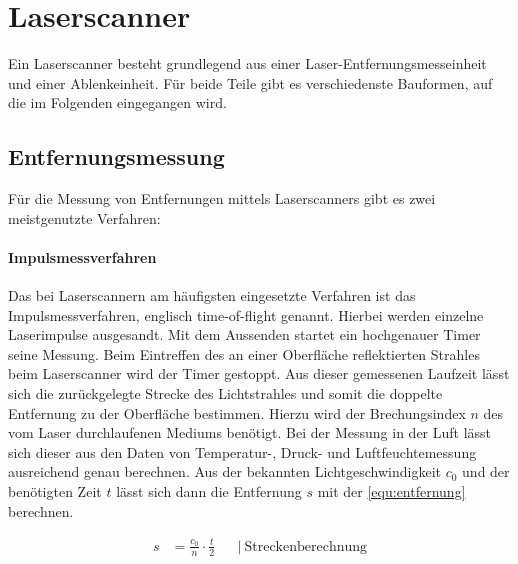 \documentclass[a4paper,12pt,bibliography=totoc, listof=totoc,titlepage,pointlessnumbers]{scrreprt}
\begin{document}
\section{Laser\-scan\-ner}
Ein Laser\-scan\-ner besteht grundlegend aus einer Laser-Entfernungsmesseinheit und einer Ablenkeinheit. Für beide Teile gibt es verschiedenste Bauformen, auf die im Folgenden eingegangen wird.

\subsection{Entfernungsmessung}
Für die Messung von Entfernungen mittels Laserscanners gibt es zwei meistgenutzte Verfahren:

\paragraph{Impulsmessverfahren}
\label{p:tof}
Das bei Laser\-scan\-nern am häufigsten eingesetzte Verfahren ist das Impulsmessverfahren, englisch time-of-flight genannt. Hierbei werden einzelne Laserimpulse ausgesandt. Mit dem Aussenden startet ein hochgenauer Timer seine Messung. Beim Eintreffen des an einer Oberfläche reflektierten Strahles beim Laser\-scan\-ner wird der Timer gestoppt. Aus dieser gemessenen Laufzeit lässt sich die zurückgelegte Strecke des Lichtstrahles und somit die doppelte Entfernung zu der Oberfläche bestimmen. Hierzu wird der Brechungsindex \(n\) des vom Laser durchlaufenen Mediums benötigt. Bei der Messung in der Luft lässt sich dieser aus den Daten von Temperatur-, Druck- und Luftfeuchtemessung ausreichend genau berechnen. Aus der bekannten Lichtgeschwindigkeit \(c_0\) und der benötigten Zeit \(t\) lässt sich dann die Entfernung \(s\) mit der \autoref{equ:entfernung} berechnen.

\begin{equation}
\begin{aligned}
s &=  \frac{c_0}{n} \cdot \frac{t}{2}  && \left|\  \text{Streckenberechnung} \right. \\
\end{aligned}
\label{equ:entfernung}
\end{equation}
\end{document}
